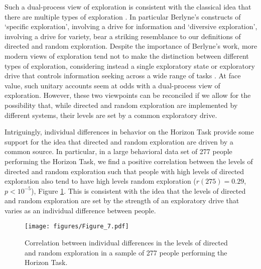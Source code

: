 \documentclass[12pt]{article}
\begin{document}
Such a dual-process view of exploration is consistent with the classical idea that there are multiple types of exploration \cite{Berlyne1966-fg}.  In particular Berlyne's constructs of `specific exploration', involving a drive for information and `diversive exploration', involving a drive for variety, bear a striking resemblance to our definitions of directed and random exploration. Despite the importance of Berlyne's work, more modern views of exploration tend not to make the distinction between different types of exploration, considering instead a single exploratory state or exploratory drive that controls information seeking across a wide range of tasks \cite{Berlyne1966-fg,Aston-Jones2005-hx,Hills2015-mi,Kidd2015-so}. At face value, such unitary accounts seem at odds with a dual-process view of exploration. However, these two viewpoints can be reconciled if we allow for the possibility that, while directed and random exploration are implemented by different systems, their levels are set by a common exploratory drive.  

Intriguingly, individual differences in behavior on the Horizon Task provide some support for the idea that directed and random exploration are driven by a common source. In particular, in a large behavioral data set of 277 people performing the Horizon Task, we find a positive correlation between the levels of directed and random exploration such that people with high levels of directed exploration also tend to have high levels random exploration ($r(275) = 0.29$, $p < 10^{-5}$), Figure \ref{fig:dirRandCorr}.  This is consistent with the idea that the levels of directed and random exploration are set by the strength of an exploratory drive that varies as an individual difference between people.


\begin{figure}[t]
\begin{center}
		\texttt{[image: figures/Figure\_7.pdf]}
\caption{Correlation between individual differences in the levels of directed and random exploration in a sample of 277 people performing the Horizon Task.}
\label{fig:dirRandCorr}
\end{center}
\end{figure}
\end{document}
